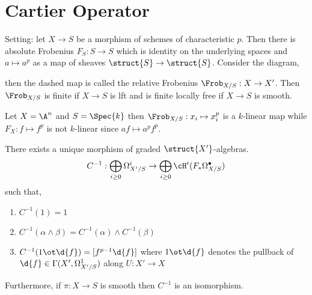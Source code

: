 \documentclass[12pt]{article}
\begin{document}
\section{Cartier Operator}

Setting: let $X \to S$ be a morphism of schemes of characteristic $p$. Then there is absolute Frobenius $F_S : S \to S$ which is identity on the underlying spaces and $a \mapsto a^p$ as a map of sheaves $\struct{S} \to \struct{S}$. Consider the diagram,
\begin{center}
\end{center}
then the dashed map is called the relative Frobenius $\Frob_{X/S} : X \to X'$. Then $\Frob_{X/S}$ is finite if $X \to S$ is lft and is finite locally free if $X \to S$ is smooth. 

\begin{example}
Let $X = \A^n$ and $S = \Spec{k}$ then $\Frob_{X/S} : x_i \mapsto x_i^p$ is a $k$-linear map while $F_X : f \mapsto f^p$ is not $k$-linear since $a f \mapsto a^p f^p$. 
\end{example}

\begin{theorem}[Cartier]
There exists a unique morphism of graded $\struct{X'}$-algebras.
\[ C^{-1} : \bigoplus_{i \ge 0} \Omega_{X'/S}^i \to \bigoplus_{i \ge 0} \cH^i(F_* \Omega^\bullet_{X/S}) \]
such that,
\begin{enumerate}
\item $C^{-1}(1) = 1$
\item $C^{-1}(\alpha \wedge \beta) = C^{-1}(\alpha) \wedge C^{-1}(\beta)$
\item $C^{-1}(1 \ot \d{f}) = [f^{p-1} \d{f}]$ where $1 \ot \d{f}$ denotes the pullback of $\d{f} \in \Gamma(X', \Omega_{X'/S}^1)$ along $ U : X' \to X$
\end{enumerate}
Furthermore, if $\pi : X \to S$ is smooth then $C^{-1}$ is an isomorphism. 
\end{theorem}
\end{document}

